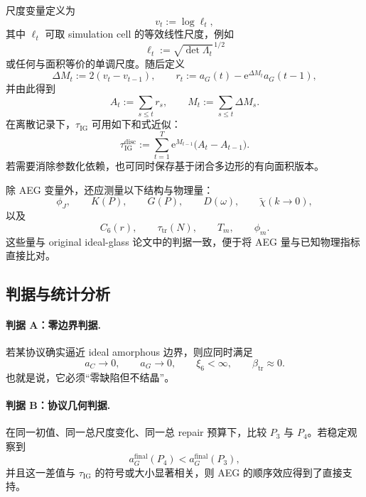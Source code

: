 \documentclass[12pt]{ctexart}
\newcommand{\IG}{\mathrm{IG}}
\newcommand{\ee}{\mathrm{e}}
\newcommand{\tr}{\mathrm{tr}}
\begin{document}
尺度变量定义为
\begin{equation}
v_t := \log \ell_t,
\end{equation}
其中 $\ell_t$ 可取 simulation cell 的等效线性尺度，例如
\begin{equation}
\ell_t := \sqrt{\det \Lambda_t}^{\,1/2}
\end{equation}
或任何与面积等价的单调尺度。随后定义
\begin{equation}
\Delta M_t:=2(v_t-v_{t-1}),
\qquad
r_t:=a_G(t)-\ee^{\Delta M_t}a_G(t-1),
\end{equation}
并由此得到
\begin{equation}
A_t:=\sum_{s\le t} r_s,
\qquad
M_t:=\sum_{s\le t}\Delta M_s.
\end{equation}
在离散记录下，$\tau_{\IG}$ 可用如下和式近似：
\begin{equation}
\tau_{\IG}^{\mathrm{disc}}
:=\sum_{t=1}^{T} \ee^{M_{t-1}}\bigl(A_t-A_{t-1}\bigr).
\end{equation}
若需要消除参数化依赖，也可同时保存基于闭合多边形的有向面积版本。

除 AEG 变量外，还应测量以下结构与物理量：
\begin{equation}
\phi_J,\qquad K(P),\qquad G(P),\qquad D(\omega),\qquad \tilde\chi(k\to 0),
\end{equation}
以及
\begin{equation}
C_6(r),\qquad \tau_{\tr}(N),\qquad T_m,\qquad \phi_m.
\end{equation}
这些量与 original ideal-glass 论文中的判据一致，便于将 AEG 量与已知物理指标直接比对。

\subsection{判据与统计分析}

\paragraph{判据 A：零边界判据.}
若某协议确实逼近 ideal amorphous 边界，则应同时满足
\begin{equation}
a_C\to 0,
\qquad
a_G\to 0,
\qquad
\xi_6<\infty,
\qquad
\beta_{\tr}\approx 0.
\end{equation}
也就是说，它必须“零缺陷但不结晶”。

\paragraph{判据 B：协议几何判据.}
在同一初值、同一总尺度变化、同一总 repair 预算下，比较 $P_3$ 与 $P_4$。若稳定观察到
\begin{equation}
a_G^{\mathrm{final}}(P_4) < a_G^{\mathrm{final}}(P_3),
\end{equation}
并且这一差值与 $\tau_{\IG}$ 的符号或大小显著相关，则 AEG 的顺序效应得到了直接支持。
\end{document}
